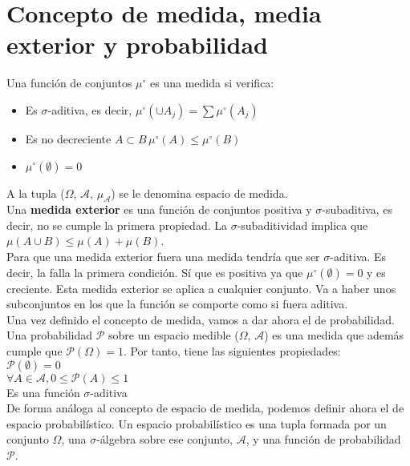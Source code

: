\documentclass[12pt,a4paper]{book}
\begin{document}
\section{Concepto de medida, media exterior y probabilidad}
Una función de conjuntos $\mu^\circ$ es una medida si verifica:
\begin{itemize}
\item Es $\sigma$-aditiva, es decir,  $\mu^\circ (\cup A_j) = \displaystyle \sum \mu^\circ (A_j)$
\item Es no decreciente $A\subset B \, \mu^\circ(A)\leq \mu^\circ(B)$
\item $\mu^\circ(\emptyset)=0$
\end{itemize}

A la tupla ($\Omega$, $\mathcal{A}$, $\mu_{\mathcal{A}}$) se le denomina espacio de medida.\\

Una \textbf{medida exterior} es una función de conjuntos positiva y $\sigma$-subaditiva, es decir, no se cumple la primera propiedad. La $\sigma$-subaditividad implica que $\mu(A \cup B) \leq \mu(A) + \mu(B)$.\\

Para que una medida exterior fuera una medida tendría que ser $\sigma$-aditiva. Es decir, la falla la primera condición. Sí que es positiva ya que $\mu^\circ(\emptyset)=0$ y es creciente. Esta medida exterior se aplica a cualquier conjunto. Va a haber unos subconjuntos en los que la función se comporte como si fuera aditiva.\\

Una vez definido el concepto de medida, vamos a dar ahora el de probabilidad. Una probabilidad $\mathcal{P}$ sobre un espacio medible ($\Omega$, $\mathcal{A}$) es una medida que además cumple que $\mathcal{P}(\Omega)=1$. Por tanto, tiene las siguientes propiedades:\\

$\mathcal{P}(\emptyset)=0$\\
$\forall A \in \mathcal{A}, 0 \leq \mathcal{P}(A) \leq 1$\\
Es una función $\sigma$-aditiva\\

De forma análoga al concepto de espacio de medida, podemos definir ahora el de espacio probabilístico. Un espacio probabilístico es una tupla formada por un conjunto $\Omega$, una $\sigma$-álgebra sobre ese conjunto, $\mathcal{A}$, y una función de probabilidad $\mathcal{P}$.
\end{document}
